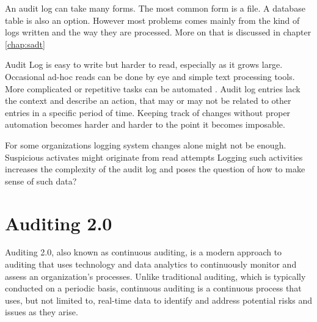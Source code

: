 

An audit log can take many forms. The most common form is a file. A database table is also an option. However most problems comes mainly from the kind of logs written and the way they are processed. More on that is discussed in chapter \ref{chap:sadt}

Audit Log is easy to write but harder to read, especially as it grows large. Occasional ad-hoc reads can be done by eye and simple text processing tools. More complicated or repetitive tasks can be automated \citep{AuditLog}. Audit log entries lack the context and describe an action, that may or may not be related to other entries in a specific period of time. Keeping track of changes without proper automation becomes harder and harder to the point it becomes imposable.

For some organizations logging system changes alone might not be enough. Suspicious activates might originate from read attempts Logging such activities increases the complexity of the audit log and poses the question of how to make sense of such data?


\section{Auditing 2.0}\label{sec:adt2}

Auditing 2.0, also known as continuous auditing, is a modern approach to auditing that uses technology and data analytics to continuously monitor and assess an organization's processes. Unlike traditional auditing, which is typically conducted on a periodic basis, continuous auditing is a continuous process that uses, but not limited to, real-time data to identify and address potential risks and issues as they arise.~\citep{5427384}

